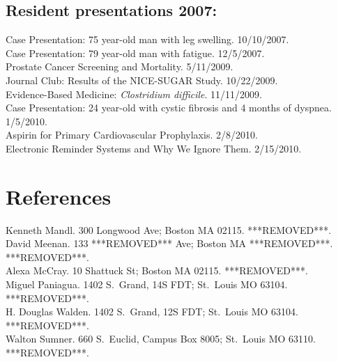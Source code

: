 \documentclass[12pt]{article}
\begin{document}
\subsection*{Resident presentations 2007:}
Case Presentation: 75 year-old man with leg swelling. 10/10/2007.\\
Case Presentation: 79 year-old man with fatigue. 12/5/2007.\\
Prostate Cancer Screening and Mortality. 5/11/2009.\\
Journal Club: Results of the NICE-SUGAR Study. 10/22/2009.\\
Evidence-Based Medicine: \emph{Clostridium difficile}. 11/11/2009.\\
Case Presentation: 24 year-old with cystic fibrosis and 4 months of
dyspnea. 1/5/2010.\\
Aspirin for Primary Cardiovascular Prophylaxis. 2/8/2010.\\
Electronic Reminder Systems and Why We Ignore Them. 2/15/2010.

\section*{References}
Kenneth Mandl. 300 Longwood Ave; Boston MA 02115. ***REMOVED***.\\
David Meenan. 133 ***REMOVED*** Ave; Boston MA ***REMOVED***. ***REMOVED***.\\
Alexa McCray. 10 Shattuck St; Boston MA 02115. ***REMOVED***.\\
Miguel Paniagua. 1402 S.\ Grand, 14S FDT; St.\ Louis MO 63104.
***REMOVED***.\\
H. Douglas Walden. 1402 S.\ Grand, 12S FDT; St.\ Louis MO 63104.
***REMOVED***.\\
Walton Sumner. 660 S.\ Euclid, Campus Box 8005; St.\ Louis MO 63110.
***REMOVED***.
\end{document}
